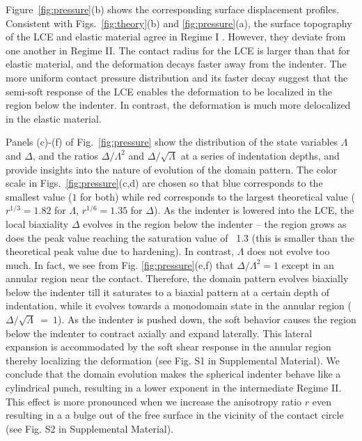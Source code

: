 \documentclass[12pt]{article}
\begin{document}
Figure~\ref{fig:pressure}(b) shows the corresponding surface displacement profiles.  Consistent with Figs.~\ref{fig:theory}(b) and \ref{fig:pressure}(a), the surface topography of the LCE and elastic material agree in Regime I .  However, they deviate from one another in Regime II.  The contact radius for the LCE is larger than that for elastic material, and the deformation decays faster away from the indenter. 
The more uniform contact pressure distribution and its faster decay suggest that the semi-soft response of the LCE enables the deformation to be localized in the region below the indenter. In contrast, the deformation is much more delocalized in the elastic material.

Panels (c)-(f) of Fig.~\ref{fig:pressure} show the distribution of the state variables $\Lambda$ and $\Delta$, and the ratios $\Delta/\Lambda^2$ and $\Delta/\sqrt{\Lambda}$ at a series of indentation depths, and provide  insights into the nature of evolution of the domain pattern.  The color scale in Figs.~\ref{fig:pressure}(c,d) are chosen so that blue corresponds to the smallest value ($1$ for both) while red corresponds to the largest theoretical value ($r^{1/3} = 1.82$ for $\Lambda$, $r^{1/6} = 1.35$ for $\Delta$).  As the indenter is lowered into the LCE, the local biaxiality $\Delta$ evolves in the region below the indenter -- the region grows as does the peak value reaching the saturation value of ~1.3 (this is smaller than the theoretical peak value due to hardening).  In contrast, $\Lambda$ does not evolve too much.  In fact, we see from Fig. \ref{fig:pressure}(e,f) that $\Delta/\Lambda^2=1$ except in an annular region near the contact.  Therefore, the domain pattern evolves biaxially below the indenter till it saturates to a biaxial pattern at a certain depth of indentation, while it evolves towards a monodomain state in the annular region ($\Delta/\sqrt{\Lambda} \ =\ 1$).  As the indenter is pushed down, the soft behavior causes the region below the indenter to contract axially and expand laterally. This lateral expansion is accommodated by the soft shear response in the annular region thereby localizing the deformation (see Fig. S1 in Supplemental Material). 
We conclude that the domain evolution makes the spherical indenter behave like a cylindrical punch, resulting in a lower exponent in the intermediate Regime II. This effect is more pronounced when we increase the anisotropy ratio $r$ even resulting in a a bulge out of the free surface in the  vicinity of the contact circle (see Fig. S2 in Supplemental Material).
\end{document}
